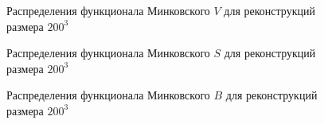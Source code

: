			\begin{figure}[h]
				\begin{minipage}[h]{0.49\linewidth}
				\end{minipage}
				\hfill
				\begin{minipage}[h]{0.49\linewidth}
				\end{minipage}
				\caption{Распределения функционала Минковского $V$ для реконструкций размера $200^3$}
				\label{5-dist-V-200}
			\end{figure}
			
			\begin{figure}[h]
				\begin{minipage}[h]{0.49\linewidth}
				\end{minipage}
				\hfill
				\begin{minipage}[h]{0.49\linewidth}
				\end{minipage}
				\caption{Распределения функционала Минковского $S$ для реконструкций размера $200^3$}
				\label{5-dist-S-200}
			\end{figure}
			
			\begin{figure}[h]
				\begin{minipage}[h]{0.49\linewidth}
				\end{minipage}
				\hfill
				\begin{minipage}[h]{0.49\linewidth}
				\end{minipage}
				\caption{Распределения функционала Минковского $B$ для реконструкций размера $200^3$}
				\label{5-dist-B-200}
			\end{figure}
			
